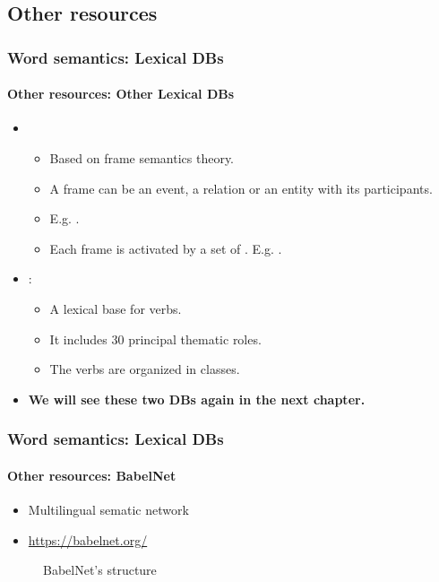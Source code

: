 \documentclass[xcolor=table]{beamer}
\begin{document}
\subsection{Other resources}

\begin{frame}
\frametitle{Word semantics: Lexical DBs}
\framesubtitle{Other resources: Other Lexical DBs}
	
\begin{itemize}
	\item {} 
	\begin{itemize}
		\item Based on frame semantics theory.
		\item A frame can be an event, a relation or an entity with its participants.
		\item E.g. .
		\item Each frame is activated by a set of . E.g. .
	\end{itemize}
	\item {}:
	\begin{itemize}
		\item A lexical base for verbs.
		\item It includes 30 principal thematic roles.
		\item The verbs are organized in classes.
	\end{itemize}
	\item \textbf{We will see these two DBs again in the next chapter.}
\end{itemize}
	
\end{frame}

\begin{frame}
\frametitle{Word semantics: Lexical DBs}
\framesubtitle{Other resources: BabelNet}

\begin{itemize}
	\item Multilingual sematic network
	\item \url{https://babelnet.org/}
\end{itemize}

\begin{figure}
	\caption{BabelNet's structure \cite{2012-navigli-ponzetto}}
\end{figure}
	
\end{frame}
\end{document}
